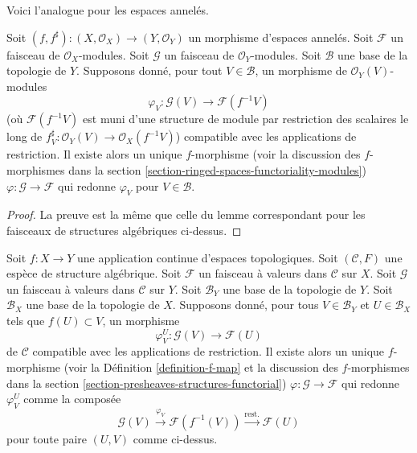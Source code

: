 \noindent
Voici l'analogue pour les espaces annelés.

\begin{lemma}
\label{lemma-f-map-basis-below-modules}
Soit $(f, f^\sharp) : (X, \mathcal{O}_X) \to (Y, \mathcal{O}_Y)$
un morphisme d'espaces annelés.
Soit $\mathcal{F}$ un faisceau de $\mathcal{O}_X$-modules.
Soit $\mathcal{G}$ un faisceau de $\mathcal{O}_Y$-modules.
Soit $\mathcal{B}$ une base de la topologie de $Y$.
Supposons donné, pour tout $V \in \mathcal{B}$, un
morphisme de $\mathcal{O}_Y(V)$-modules
$$
\varphi_V :
\mathcal{G}(V)
\longrightarrow
\mathcal{F}(f^{-1}V)
$$
(où $\mathcal{F}(f^{-1}V)$ est muni d'une structure de module par restriction des scalaires le long de
$f^\sharp_V : \mathcal{O}_Y(V) \to \mathcal{O}_X(f^{-1}V)$)
compatible avec les applications de restriction.
Il existe alors un unique $f$-morphisme (voir la discussion des $f$-morphismes dans la
section \ref{section-ringed-spaces-functoriality-modules})
$\varphi : \mathcal{G} \to \mathcal{F}$
qui redonne $\varphi_V$ pour $V \in \mathcal{B}$.
\end{lemma}

\begin{proof}
La preuve est la même que celle du lemme correspondant
pour les faisceaux de structures algébriques ci-dessus.
\end{proof}

\begin{lemma}
\label{lemma-f-map-basis-above-and-below-structures}
Soit $f : X \to Y$ une application continue d'espaces topologiques.
Soit $(\mathcal{C}, F)$ une espèce de structure algébrique.
Soit $\mathcal{F}$ un faisceau à valeurs dans $\mathcal{C}$ sur $X$.
Soit $\mathcal{G}$ un faisceau à valeurs dans $\mathcal{C}$ sur $Y$.
Soit $\mathcal{B}_Y$ une base de la topologie de $Y$.
Soit $\mathcal{B}_X$ une base de la topologie de $X$.
Supposons donné, pour tous $V \in \mathcal{B}_Y$ et
$U \in \mathcal{B}_X$ tels que $f(U) \subset V$, un morphisme
$$
\varphi_V^U :
\mathcal{G}(V)
\longrightarrow
\mathcal{F}(U)
$$
de $\mathcal{C}$ compatible avec les applications de restriction.
Il existe alors un unique $f$-morphisme (voir
la Définition \ref{definition-f-map} et la discussion
des $f$-morphismes dans la section \ref{section-presheaves-structures-functorial})
$\varphi : \mathcal{G} \to \mathcal{F}$
qui redonne $\varphi_V^U$ comme la composée
$$
\mathcal{G}(V) \xrightarrow{\varphi_V}
\mathcal{F}(f^{-1}(V)) \xrightarrow{\text{rest.}}
\mathcal{F}(U)
$$
pour toute paire $(U, V)$ comme ci-dessus.
\end{lemma}

